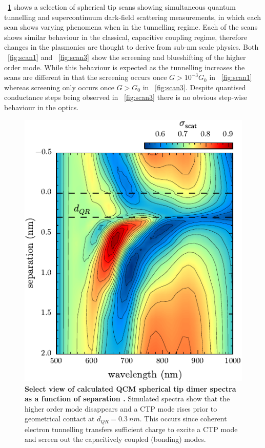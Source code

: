 \documentclass[a4paper]{article}
\begin{document}
\begin{figure}[h]
\label{fig:spherical_tip_scans}
\end{figure}

\figurename~\ref{fig:spherical_tip_scans} shows a selection of spherical tip scans showing simultaneous quantum tunnelling and supercontinuum dark-field scattering measurements, in which each scan shows varying phenomena when in the tunnelling regime. Each of the scans shows similar behaviour in the classical, capacitive coupling regime, therefore changes in the plasmonics are thought to derive from sub-nm scale physics.
Both \figurename~\ref{fig:scan1} and \figurename~\ref{fig:scan3} show the screening and blueshifting of the higher order mode. While this behaviour is expected as the tunnelling increases the scans are different in that the screening occurs once $G>10^{-3}G_0$ in \figurename~\ref{fig:scan1} whereas screening only occurs once $G>G_0$ in \figurename~\ref{fig:scan3}. Despite quantised conductance steps being observed in \figurename~\ref{fig:scan3} there is no obvious step-wise behaviour in the optics.

\begin{figure}[bt]
\centering
\includegraphics{figures/qcm_tip_theory_zoom}
\caption[Select view of calculated QCM spherical tip dimer spectra as a function of separation \cite{savage2012}]{\textbf{Select view of calculated QCM spherical tip dimer spectra as a function of separation \cite{savage2012}.} Simulated spectra show that the higher order mode disappears and a CTP mode rises prior to geometrical contact at $d_{QR}=\SI{0.3}{nm}$. This occurs since coherent electron tunnelling transfers sufficient charge to excite a CTP mode and screen out the capacitively coupled (bonding) modes.}
\label{fig:qcm_tip_theory}
\end{figure}
\end{document}
